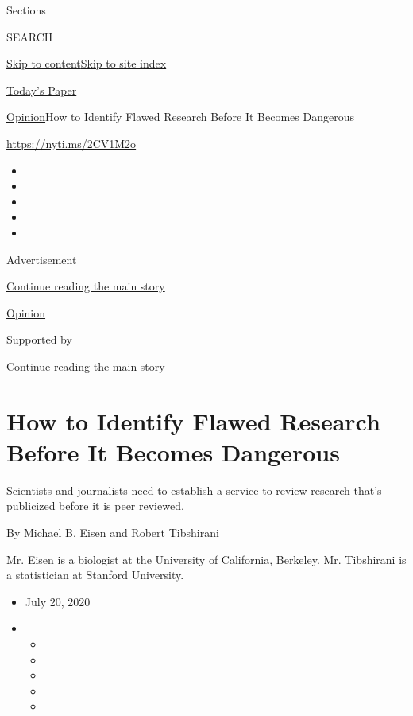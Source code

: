 Sections

SEARCH

\protect\hyperlink{site-content}{Skip to
content}\protect\hyperlink{site-index}{Skip to site index}

\href{https://myaccount.nytimes3xbfgragh.onion/auth/login?response_type=cookie\&client_id=vi}{}

\href{https://www.nytimes3xbfgragh.onion/section/todayspaper}{Today's
Paper}

\href{/section/opinion}{Opinion}\textbar{}How to Identify Flawed
Research Before It Becomes Dangerous

\url{https://nyti.ms/2CV1M2o}

\begin{itemize}
\item
\item
\item
\item
\item
\end{itemize}

Advertisement

\protect\hyperlink{after-top}{Continue reading the main story}

\href{/section/opinion}{Opinion}

Supported by

\protect\hyperlink{after-sponsor}{Continue reading the main story}

\hypertarget{how-to-identify-flawed-research-before-it-becomes-dangerous}{%
\section{How to Identify Flawed Research Before It Becomes
Dangerous}\label{how-to-identify-flawed-research-before-it-becomes-dangerous}}

Scientists and journalists need to establish a service to review
research that's publicized before it is peer reviewed.

By Michael B. Eisen and Robert Tibshirani

Mr. Eisen is a biologist at the University of California, Berkeley. Mr.
Tibshirani is a statistician at Stanford University.

\begin{itemize}
\item
  July 20, 2020
\item
  \begin{itemize}
  \item
  \item
  \item
  \item
  \item
  \end{itemize}
\end{itemize}

